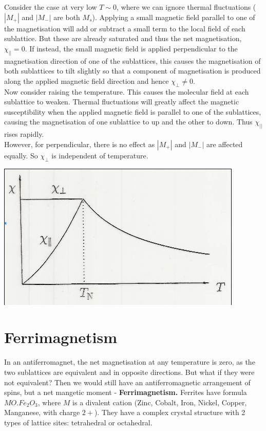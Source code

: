\documentclass[a4paper, 11pt, normalem]{report}
\begin{document}
Consider the case at very low $T \sim 0$, where we can ignore thermal fluctuations ($|M_+|$ and $|M_-|$ are both $M_s$).
Applying a small magnetic field parallel to one of the magnetisation will add or subtract a small term to the local field of each sublattice. 
But these are already saturated and thus the net magnetisation, $\chi_{||} = 0$.
If instead, the small magnetic field is applied perpendicular to the magnetisation direction of one of the sublattices, this causes the magnetisation of both sublattices to tilt slightly so that a component of magnetisation is produced along the applied magnetic field direction and hence $\chi_{\perp} \neq 0$.\\
Now consider raising the temperature. 
This causes the molecular field at each sublattice to weaken. 
Thermal fluctuations will greatly affect the magnetic susceptibility when the applied magnetic field is parallel to one of the sublattices, causing the magnetisation of one sublattice to up and the other to down. 
Thus $\chi_{||}$ rises rapidly. \\
However, for perpendicular, there is no effect as $|M_+|$ and $|M_-|$ are affected equally. 
So $\chi_{\perp}$ is independent of temperature.
\begin{center}
    \includegraphics[scale=0.5]{chipar.png}
\end{center}

\section{Ferrimagnetism}
In an antiferromagnet, the net magnetisation at any temperature is zero, as the two sublattices are equivalent and in opposite directions. 
But what if they were not equivalent?
Then we would still have an antiferromagnetic arrangement of spins, but a net mangetic moment - \textbf{Ferrimagnetism.}
Ferrites have formula $MO.Fe_2O_3$, where $M$ is a divalent cation (Zinc, Cobalt, Iron, Nickel, Copper, Manganese, with charge $2+$).
They have a complex crystal structure with 2 types of lattice sites: tetrahedral or octahedral. 
\end{document}
